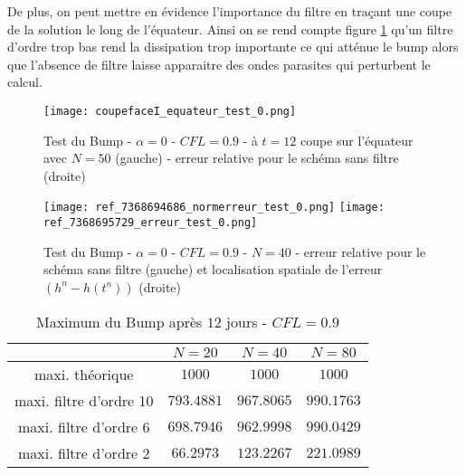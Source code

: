 De plus, on peut mettre en évidence l'importance du filtre en traçant une coupe de la solution le long de l'équateur. Ainsi on se rend compte figure \ref{table adv4} qu'un filtre d'ordre trop bas rend la dissipation trop importante ce qui atténue le bump alors que l'absence de filtre laisse apparaitre des ondes parasites qui perturbent le calcul.


\begin{figure}[ht]
\begin{center}
\texttt{[image: coupefaceI\_equateur\_test\_0.png]}
\caption{Test du Bump - $\alpha = 0$ - $CFL=0.9$ - à $t=12$ coupe sur l'équateur avec $N=50$ (gauche) - erreur relative pour le schéma sans filtre (droite)}
\label{table adv4}
\end{center}
\end{figure}

\begin{figure}[ht]
\begin{center}
\texttt{[image: ref\_7368694686\_normerreur\_test\_0.png]}
\texttt{[image: ref\_7368695729\_erreur\_test\_0.png]}
\caption{Test du Bump - $\alpha = 0$ - $CFL=0.9$ - $N=40$ - erreur relative pour le schéma sans filtre (gauche) et localisation spatiale de l'erreur $( h^n - h(t^n))$ (droite)}
\label{table adv5}
\end{center}
\end{figure}


\begin{table}[ht]
\begin{center}
\begin{tabular}{c|ccc}
\hline
 & $N=20$ &$N=40$ &$N=80$\\
\hline 
\hline
maxi. théorique & $1000$ & $1000$ & $1000$ \\ 
\hline 
maxi. filtre d'ordre 10 & $793.4881$& $967.8065$ & $990.1763$  \\ 
\hline 
maxi. filtre d'ordre 6 & $698.7946$& $962.9998$ & $990.0429$  \\ 
\hline 
maxi. filtre d'ordre 2 & $66.2973$ & $123.2267$ & $221.0989$  \\ 
\hline 
\end{tabular} 
\caption{Maximum du Bump après $12$ jours - $CFL=0.9$}
\end{center}
\end{table}




